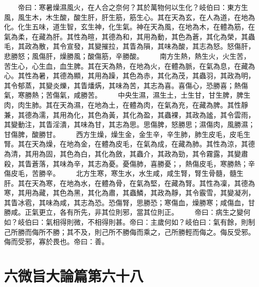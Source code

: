 　　帝曰：寒暑燥濕風火，在人合之奈何？其於萬物何以生化？岐伯曰：東方生風，風生木，木生酸，酸生肝，肝生筋，筋生心。其在天為玄，在人為道，在地為化。化生五味，道生智，玄生神，化生氣。神在天為風，在地為木，在體為筋，在氣為柔，在藏為肝。其性為暄，其德為和，其用為動，其色為蒼，其化為榮，其蟲毛，其政為散，其令宣發，其變摧拉，其眚為隕，其味為酸，其志為怒。怒傷肝，悲勝怒；風傷肝，燥勝風；酸傷筋，辛勝酸。
　　南方生熱，熱生火，火生苦，苦生心，心生血，血生脾。其在天為熱，在地為火，在體為脈，在氣為息，在藏為心。其性為暑，其德為顯，其用為躁，其色為赤，其化為茂，其蟲羽，其政為明，其令郁蒸，其變炎爍，其眚燔焫，其味為苦，其志為喜。喜傷心，恐勝喜；熱傷氣，寒勝熱；苦傷氣，咸勝苦。
　　中央生濕，濕生土，土生甘，甘生脾，脾生肉，肉生肺。其在天為濕，在地為土，在體為肉，在氣為充，在藏為脾。其性靜兼，其德為濡，其用為化，其色為黃，其化為盈，其蟲裸，其政為謐，其令雲雨，其變動注，其眚淫潰，其味為甘，其志為思。思傷脾，怒勝思；濕傷肉，風勝濕；甘傷脾，酸勝甘。
　　西方生燥，燥生金，金生辛，辛生肺，肺生皮毛，皮毛生腎。其在天為燥，在地為金，在體為皮毛，在氣為成，在藏為肺。其性為涼，其德為清，其用為固，其色為白，其化為斂，其蟲介，其政為勁，其令霧露，其變肅殺，其眚蒼落，其味為辛，其志為憂。憂傷肺，喜勝憂；，熱傷皮毛，寒勝熱；辛傷皮毛，苦勝辛。
　　北方生寒，寒生水，水生咸，咸生腎，腎生骨髓，髓生肝。其在天為寒，在地為水，在體為骨，在氣為堅，在藏為腎。其性為凜，其德為寒，其用為藏，其色為黑，其化為肅，其蟲鱗，其政為靜，其令霰雪，其變凝冽，其眚冰雹，其味為咸，其志為恐。恐傷腎，思勝恐；寒傷血，燥勝寒；咸傷血，甘勝咸。正氣更立，各有所先，非其位則邪，當其位則正。
　　帝曰：病生之變何如？岐伯曰：氣相得則微，不相得則甚。帝曰：主歲何如？岐伯曰：氣有餘，則制己所勝而侮所不勝；其不及，則己所不勝侮而乘之，己所勝輕而侮之。侮反受邪。侮而受邪，寡於畏也。帝曰：善。


\section{六微旨大論篇第六十八}

